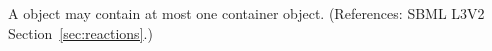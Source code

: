 A \KineticLaw object may contain at most one \ListOfLocalParameters
container object.  (References: SBML L3V2 Section~\ref{sec:reactions}.)
